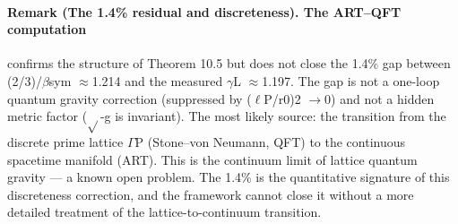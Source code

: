 \paragraph*{Remark (The 1.4\% residual and discreteness). The ART--QFT computation}
confirms the structure of Theorem 10.5 but does not close the 1.4\% gap between (2/3)/$\beta$sym $\approx$1.214 and the measured $\gamma$L $\approx$1.197. The gap is not a one-loop
quantum gravity correction (suppressed by ($\ell$P/r0)2 $\to$0) and not a hidden metric factor ($\sqrt{}$-g is invariant). The most likely source: the transition from the discrete prime lattice $\Gamma$P (Stone--von Neumann, QFT) to the continuous spacetime manifold (ART). This is the continuum limit of lattice quantum gravity --- a known open problem. The 1.4\% is the quantitative signature of this discreteness correction, and the framework cannot close it without a more detailed treatment of the lattice-to-continuum transition.

